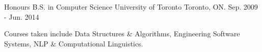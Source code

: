 

\begin{cventries}

  \cventry
    {Honours B.S. in Computer Science} %
    {University of Toronto} %
    {Toronto, ON.} %
    {Sep. 2009 - Jun. 2014} %
    {
      \begin{cvitems} %
        \item {Courses taken include Data Structures \& Algorithms, Engineering Software Systems, NLP \& Computational Linguistics.}
      \end{cvitems}
    }

\end{cventries}
